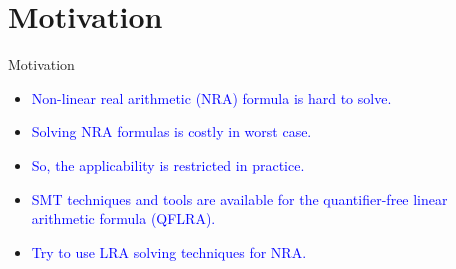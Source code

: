 \documentclass[]{beamer}
\begin{document}
\section{Motivation}
\begin{frame}{Motivation}
    \begin{itemize}
        \item \textcolor<1>{blue}{Non-linear real arithmetic (NRA) formula is hard to solve.}
		\item \textcolor<2>{blue}{Solving NRA formulas is costly in worst case.}
		\item \textcolor<3>{blue}{So, the applicability is restricted in practice.}
		\item \textcolor<4>{blue}{SMT techniques and tools are available for the quantifier-free linear arithmetic formula (QFLRA).}
		\item \textcolor<5>{blue}{Try to use LRA solving techniques for NRA.}
    \end{itemize}
\end{frame}
\end{document}

